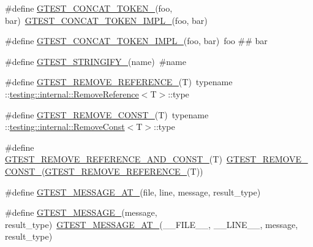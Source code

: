 \begin{DoxyCompactItemize}
\item 
\#define \hyperlink{gtest-internal_8h_ae3c336cbe1ae2bd1b1d019333e4428a0}{G\+T\+E\+S\+T\+\_\+\+C\+O\+N\+C\+A\+T\+\_\+\+T\+O\+K\+E\+N\+\_\+}(foo,  bar)~\hyperlink{gtest-internal_8h_aa39fb5346d3573feebe4257cb3a01fde}{G\+T\+E\+S\+T\+\_\+\+C\+O\+N\+C\+A\+T\+\_\+\+T\+O\+K\+E\+N\+\_\+\+I\+M\+P\+L\+\_\+}(foo, bar)
\item 
\#define \hyperlink{gtest-internal_8h_aa39fb5346d3573feebe4257cb3a01fde}{G\+T\+E\+S\+T\+\_\+\+C\+O\+N\+C\+A\+T\+\_\+\+T\+O\+K\+E\+N\+\_\+\+I\+M\+P\+L\+\_\+}(foo,  bar)~foo \#\# bar
\item 
\#define \hyperlink{gtest-internal_8h_affa935d4361fa573644e9c739dde2b14}{G\+T\+E\+S\+T\+\_\+\+S\+T\+R\+I\+N\+G\+I\+F\+Y\+\_\+}(name)~\#name
\item 
\#define \hyperlink{gtest-internal_8h_a84c72f25a6a6600e3ff8381ca6982ae9}{G\+T\+E\+S\+T\+\_\+\+R\+E\+M\+O\+V\+E\+\_\+\+R\+E\+F\+E\+R\+E\+N\+C\+E\+\_\+}(T)~typename \+::\hyperlink{structtesting_1_1internal_1_1RemoveReference}{testing\+::internal\+::\+Remove\+Reference}$<$T$>$\+::type
\item 
\#define \hyperlink{gtest-internal_8h_a2ffec8c60510eb130af387f5ce9a756a}{G\+T\+E\+S\+T\+\_\+\+R\+E\+M\+O\+V\+E\+\_\+\+C\+O\+N\+S\+T\+\_\+}(T)~typename \+::\hyperlink{structtesting_1_1internal_1_1RemoveConst}{testing\+::internal\+::\+Remove\+Const}$<$T$>$\+::type
\item 
\#define \hyperlink{gtest-internal_8h_a874567b176266188fabfffb8393267ce}{G\+T\+E\+S\+T\+\_\+\+R\+E\+M\+O\+V\+E\+\_\+\+R\+E\+F\+E\+R\+E\+N\+C\+E\+\_\+\+A\+N\+D\+\_\+\+C\+O\+N\+S\+T\+\_\+}(T)~\hyperlink{gtest-internal_8h_a2ffec8c60510eb130af387f5ce9a756a}{G\+T\+E\+S\+T\+\_\+\+R\+E\+M\+O\+V\+E\+\_\+\+C\+O\+N\+S\+T\+\_\+}(\hyperlink{gtest-internal_8h_a84c72f25a6a6600e3ff8381ca6982ae9}{G\+T\+E\+S\+T\+\_\+\+R\+E\+M\+O\+V\+E\+\_\+\+R\+E\+F\+E\+R\+E\+N\+C\+E\+\_\+}(T))
\item 
\#define \hyperlink{gtest-internal_8h_a8d70025c45a47a493780746dfd66d565}{G\+T\+E\+S\+T\+\_\+\+M\+E\+S\+S\+A\+G\+E\+\_\+\+A\+T\+\_\+}(file,  line,  message,  result\+\_\+type)
\item 
\#define \hyperlink{gtest-internal_8h_a94c73d5368ec946bc354d0992ad00810}{G\+T\+E\+S\+T\+\_\+\+M\+E\+S\+S\+A\+G\+E\+\_\+}(message,  result\+\_\+type)~\hyperlink{gtest-internal_8h_a8d70025c45a47a493780746dfd66d565}{G\+T\+E\+S\+T\+\_\+\+M\+E\+S\+S\+A\+G\+E\+\_\+\+A\+T\+\_\+}(\+\_\+\+\_\+\+F\+I\+L\+E\+\_\+\+\_\+, \+\_\+\+\_\+\+L\+I\+N\+E\+\_\+\+\_\+, message, result\+\_\+type)

\end{DoxyCompactItemize}
